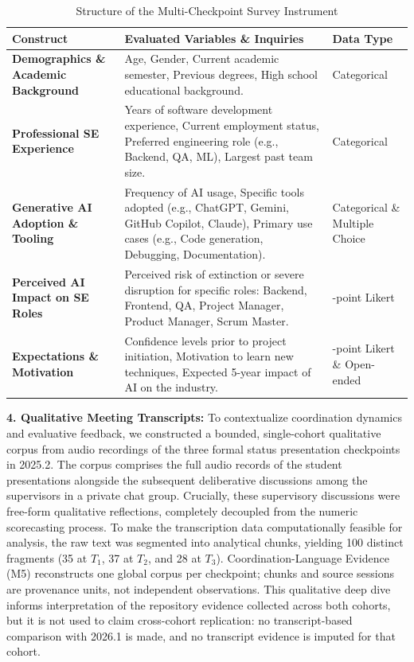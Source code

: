 \begin{table}[t]
\caption{Structure of the Multi-Checkpoint Survey Instrument}
\label{tab:survey_instrument}
\centering
\begin{tabularx}{\textwidth}{@{}>{\raggedright\arraybackslash}p{3.5cm}>{\raggedright\arraybackslash}X>{\raggedright\arraybackslash}p{2.5cm}@{}}
\toprule
\textbf{Construct} & \textbf{Evaluated Variables \& Inquiries} & \textbf{Data Type} \\
\midrule
\textbf{Demographics \& Academic Background} & Age, Gender, Current academic semester, Previous degrees, High school educational background. & Categorical \\
\addlinespace
\textbf{Professional SE Experience} & Years of software development experience, Current employment status, Preferred engineering role (e.g., Backend, QA, ML), Largest past team size. & Categorical \\
\addlinespace
\textbf{Generative AI Adoption \& Tooling} & Frequency of AI usage, Specific tools adopted (e.g., ChatGPT, Gemini, GitHub Copilot, Claude), Primary use cases (e.g., Code generation, Debugging, Documentation). & Categorical \& Multiple Choice \\
\addlinespace
\textbf{Perceived AI Impact on SE Roles} & Perceived risk of extinction or severe disruption for specific roles: Backend, Frontend, QA, Project Manager, Product Manager, Scrum Master. & 5-point Likert \\
\addlinespace
\textbf{Expectations \& Motivation} & Confidence levels prior to project initiation, Motivation to learn new techniques, Expected 5-year impact of AI on the industry. & 5-point Likert \& Open-ended \\
\bottomrule
\end{tabularx}
\end{table}

\textbf{4. Qualitative Meeting Transcripts:} To contextualize coordination dynamics and evaluative feedback, we constructed a bounded, single-cohort qualitative corpus from audio recordings of the three formal status presentation checkpoints in 2025.2. The corpus comprises the full audio records of the student presentations alongside the subsequent deliberative discussions among the supervisors in a private chat group. Crucially, these supervisory discussions were free-form qualitative reflections, completely decoupled from the numeric scorecasting process. To make the transcription data computationally feasible for analysis, the raw text was segmented into analytical chunks, yielding 100 distinct fragments (35 at $T_1$, 37 at $T_2$, and 28 at $T_3$). Coordination-Language Evidence (M5) reconstructs one global corpus per checkpoint; chunks and source sessions are provenance units, not independent observations. This qualitative deep dive informs interpretation of the repository evidence collected across both cohorts, but it is not used to claim cross-cohort replication: no transcript-based comparison with 2026.1 is made, and no transcript evidence is imputed for that cohort.

